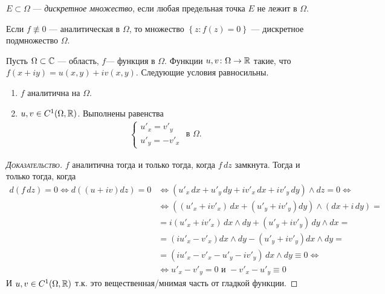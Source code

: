 \begin{df}
 $ E \subset \Omega $ --- \textit{дискретное множество}, если любая предельная точка $ E $ не лежит в $ \Omega $.
\end{df}
\begin{crly}
 Если $ f \not\equiv 0 $ --- аналитическая в $ \Omega $, то множество $ \left\{ z \colon f(z) = 0 \right\} $ --- дискретное подмножество $ \Omega $.
\end{crly}

\begin{thm}
\label{theorem:cauchy_riman}
 Пусть $ \Omega \subset \mathbb{C} $ --- область, $ f $--- функция в $ \Omega $. Функции $ u, v \colon \Omega \to \mathbb{R} $ такие, что $ f(x + iy) = u(x, y) + iv(x,y) $. Следующие условия равносильны.
 \begin{enumerate}
  \item $ f $ аналитична на $ \Omega $.
  \item $ u,v \in C^{1}(\Omega, \mathbb{R}) $. Выполнены равенства
   \begin{align*}
    \begin{cases}
     u'_x = v'_y \\
     u'_y = -v'_x
 \end{cases} \text{ в } \Omega.
   \end{align*}
 \end{enumerate}
\end{thm}
\begin{proof}[\normalfont\textsc{Доказательство}]
 $ f $ аналитична тогда и только тогда, когда $ f \, dz $ замкнута. Тогда и только тогда, когда 
\begin{align*}
d(f\,dz) = 0 \iff d((u+iv)dz) = 0 &\iff (u'_x\,dx+u'_y\,dy+iv'_x\,dx+iv'_y\,dy) \land dz = 0 \iff \\
&\iff ((u'_x + iv'_x)\,dx + (u'_y + iv'_y)dy) \land (dx + i\,dy) = \\
& = i(u'_x + iv'_x)\,dx \land dy +  (u'_y + iv'_y)\,dy\land dx = \\
& = (i u'_x - v'_x) dx \land dy - (u'_y + iv'_y) dx \land dy = \\
& = (iu'_x - v'_x - u'_y - iv'_y)\,dx \land dy \equiv 0 \iff \\
& \iff u'_x - v'_y = 0 \text{ и } -v'_x - u'_y \equiv 0
\end{align*} 
И $u, v \in C^1(\Omega, \mathbb{R})$ т.к. это вещественная/мнимая часть от гладкой функции. 
\end{proof}

